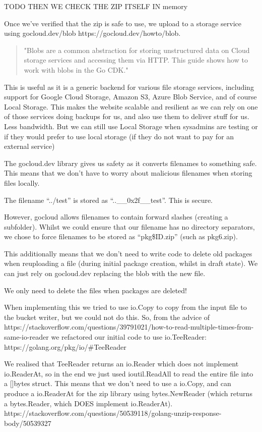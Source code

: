 \documentclass[bsc,frontabs,twoside,singlespacing,parskip,deptreport]{infthesis}     %
\begin{document}
TODO THEN WE CHECK THE ZIP ITSELF IN memory



Once we've verified that the zip is safe to use, we upload to a storage service using gocloud.dev/blob https://gocloud.dev/howto/blob.

\begin{quote}
  "Blobs are a common abstraction for storing unstructured data on Cloud storage services and accessing them via HTTP. This guide shows how to work with blobs in the Go CDK."
\end{quote}

This is useful as it is a generic backend for various file storage services, including support for Google Cloud Storage, Amazon S3, Azure Blob Service, and of course Local Storage. This makes the website scalable and resilient as we can rely on one of those services doing backups for us, and also use them to deliver stuff for us. Less bandwidth. But we can still use Local Storage when sysadmins are testing or if they would prefer to use local storage (if they do not want to pay for an external service)

The gocloud.dev library gives us safety as it converts filenames to something safe. This means that we don't have to worry about malicious filenames when storing files locally.

The filename ``../test'' is stored as ``..\_\_0x2f\_\_test''. This is secure.

However, gocloud allows filenames to contain forward slashes (creating a subfolder). Whilst we could ensure that our filename has no directory separators, we chose to force filenames to be stored as ``pkg\${ID}.zip'' (such as pkg6.zip).

This additionally means that we don't need to write code to delete old packages when reuploading a file (during initial package creation, whilst in draft state). We can just rely on gocloud.dev replacing the blob with the new file.

We only need to delete the files when packages are deleted!

When implementing this we tried to use io.Copy to copy from the input file to the bucket writer, but we could not do this. So, from the advice of https://stackoverflow.com/questions/39791021/how-to-read-multiple-times-from-same-io-reader we refactored our initial code to use io.TeeReader: https://golang.org/pkg/io/\#TeeReader

We realised that TeeReader returns an io.Reader which does not implement io.ReaderAt, so in the end we just used ioutil.ReadAll to read the entire file into a []bytes struct. This means that we don't need to use a io.Copy, and can produce a io.ReaderAt for the zip library using bytes.NewReader (which returns a bytes.Reader, which DOES implement io.ReaderAt). https://stackoverflow.com/questions/50539118/golang-unzip-response-body/50539327
\end{document}
